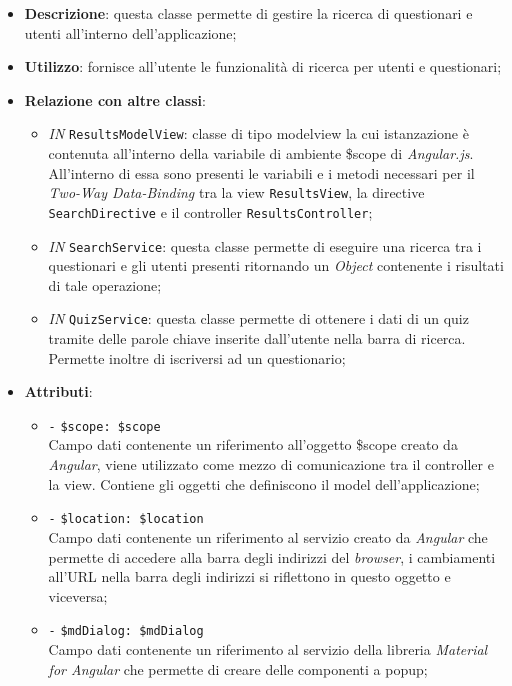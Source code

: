 \begin{itemize}
	\item \textbf{Descrizione}: questa classe permette di gestire la ricerca di questionari e utenti all'interno dell'applicazione;
	\item \textbf{Utilizzo}: fornisce all'utente le funzionalità di ricerca per utenti e questionari;
	\item \textbf{Relazione con altre classi}:
	\begin{itemize}
		\item \textit{IN} \texttt{ResultsModelView}: classe di tipo modelview la cui istanzazione è contenuta all'interno della variabile di ambiente \$scope di \textit{Angular.js}. All'interno di essa sono presenti le variabili e i metodi necessari per il \textit{Two-Way Data-Binding} tra la view \texttt{ResultsView}, la directive \texttt{SearchDirective} e il controller \texttt{ResultsController};
		\item \textit{IN} \texttt{SearchService}: questa classe permette di eseguire una ricerca tra i questionari e gli utenti presenti ritornando un \textit{Object} contenente i risultati di tale operazione;
		\item \textit{IN} \texttt{QuizService}: questa classe permette di ottenere i dati di un quiz tramite delle parole chiave inserite dall'utente nella barra di ricerca. Permette inoltre di iscriversi ad un questionario;
	\end{itemize}
	\item \textbf{Attributi}:
	\begin{itemize}
		\item \texttt{-} \texttt{\$scope: \$scope} \\
		Campo dati contenente un riferimento all’oggetto \$scope creato da \textit{Angular}, viene utilizzato come mezzo di comunicazione tra il controller e la view. Contiene gli oggetti che definiscono il model dell’applicazione;
		\item \texttt{-} \texttt{\$location: \$location} \\
		Campo dati contenente un riferimento al servizio creato da \textit{Angular} che permette di accedere alla barra degli indirizzi del \textit{browser}, i cambiamenti all’URL nella barra degli indirizzi si riflettono in questo oggetto e viceversa;
		\item \texttt{-} \texttt{\$mdDialog: \$mdDialog} \\
		Campo dati contenente un riferimento al servizio della libreria \textit{Material for Angular} che permette di creare delle componenti a popup;

\end{itemize}
\end{itemize}
